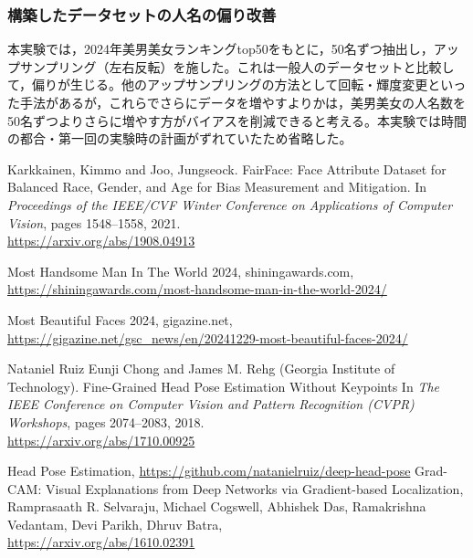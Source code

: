 \documentclass[a4paper,11pt,titlepage]{jsarticle}
\begin{document}
\subsubsection{構築したデータセットの人名の偏り改善}
本実験では，2024年美男美女ランキングtop50をもとに，50名ずつ抽出し，アップサンプリング（左右反転）を施した。これは一般人のデータセットと比較して，偏りが生じる。他のアップサンプリングの方法として回転・輝度変更といった手法があるが，これらでさらにデータを増やすよりかは，美男美女の人名数を50名ずつよりさらに増やす方がバイアスを削減できると考える。本実験では時間の都合・第一回の実験時の計画がずれていたため省略した。



\begin{thebibliography}{9}
    Karkkainen, Kimmo and Joo, Jungseock.
    FairFace: Face Attribute Dataset for Balanced Race, Gender, and Age for Bias Measurement and Mitigation.
    In \textit{Proceedings of the IEEE/CVF Winter Conference on Applications of Computer Vision}, pages 1548--1558, 2021.\\
        \url{https://arxiv.org/abs/1908.04913}
    
    Most Handsome Man In The World 2024, shiningawards.com, \\
    \url{https://shiningawards.com/most-handsome-man-in-the-world-2024/}
    
    Most Beautiful Faces 2024, gigazine.net, \\ \url{https://gigazine.net/gsc_news/en/20241229-most-beautiful-faces-2024/}
    
        Nataniel Ruiz Eunji Chong and James M. Rehg (Georgia Institute of Technology).
        Fine-Grained Head Pose Estimation Without Keypoints
         In \textit{The IEEE Conference on Computer Vision and Pattern Recognition (CVPR) Workshops}, pages 2074--2083, 2018. \\
          \url{https://arxiv.org/abs/1710.00925}

    Head Pose Estimation, \url{https://github.com/natanielruiz/deep-head-pose}
    Grad-CAM: Visual Explanations from Deep Networks via Gradient-based Localization, 
    Ramprasaath R. Selvaraju, Michael Cogswell, Abhishek Das, Ramakrishna Vedantam, Devi Parikh, Dhruv Batra,\\
    \url{https://arxiv.org/abs/1610.02391}
    
\end{thebibliography}
\end{document}
